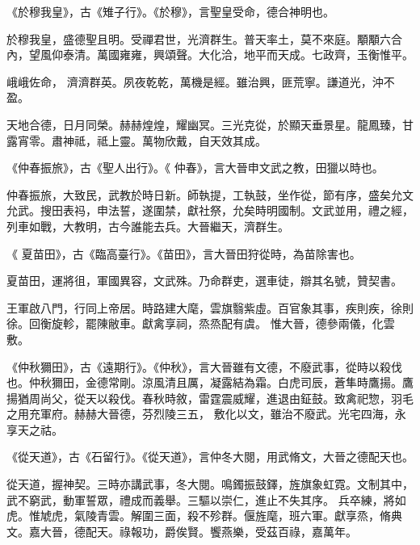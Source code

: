 \begin{pinyinscope}
 《於穆我皇》，古《雉子行》。《於穆》，言聖皇受命，德合神明也。



 於穆我皇，盛德聖且明。受禪君世，光濟群生。普天率土，莫不來庭。顒顒六合內，望風仰泰清。萬國雍雍，興頌聲。大化洽，地平而天成。七政齊，玉衡惟平。



 峨峨佐命，
 濟濟群英。夙夜乾乾，萬機是經。雖治興，匪荒寧。謙道光，沖不盈。



 天地合德，日月同榮。赫赫煌煌，耀幽冥。三光克從，於顯天垂景星。龍鳳臻，甘露宵零。肅神祗，祗上靈。萬物欣戴，自天效其成。



 《仲春振旅》，古《聖人出行》。《
 仲春》，言大晉申文武之教，田獵以時也。



 仲春振旅，大致民，武教於時日新。師執提，工執鼓，坐作從，節有序，盛矣允文允武。搜田表祃，申法誓，遂圍禁，獻社祭，允矣時明國制。文武並用，禮之經，列車如戰，大教明，古今誰能去兵。大晉繼天，濟群生。



 《
 夏苗田》，古《臨高臺行》。《苗田》，言大晉田狩從時，為苗除害也。



 夏苗田，運將徂，軍國異容，文武殊。乃命群吏，選車徒，辯其名號，贊契書。



 王軍啟八門，行同上帝居。時路建大麾，雲旗翳紫虛。百官象其事，疾則疾，徐則徐。回衡旋軫，罷陳敝車。獻禽享祠，烝烝配有虞。
 惟大晉，德參兩儀，化雲敷。



 《仲秋獮田》，古《遠期行》。《仲秋》，言大晉雖有文德，不廢武事，從時以殺伐也。仲秋獮田，金德常剛。涼風清且厲，凝露結為霜。白虎司辰，蒼隼時鷹揚。鷹揚猶周尚父，從天以殺伐。春秋時敘，雷霆震威耀，進退由鉦鼓。致禽祀惣，羽毛之用充軍府。赫赫大晉德，芬烈陵三五，
 敷化以文，雖治不廢武。光宅四海，永享天之祜。



 《從天道》，古《石留行》。《從天道》，言仲冬大閱，用武脩文，大晉之德配天也。



 從天道，握神契。三時亦講武事，冬大閱。鳴鐲振鼓鐸，旌旗象虹霓。文制其中，武不窮武，動軍誓眾，禮成而義舉。三驅以崇仁，進止不失其序。
 兵卒練，將如虎。惟虓虎，氣陵青雲。解圍三面，殺不殄群。偃旌麾，班六軍。獻享烝，脩典文。嘉大晉，德配天。祿報功，爵俟賢。饗燕樂，受茲百祿，嘉萬年。




\end{pinyinscope}

